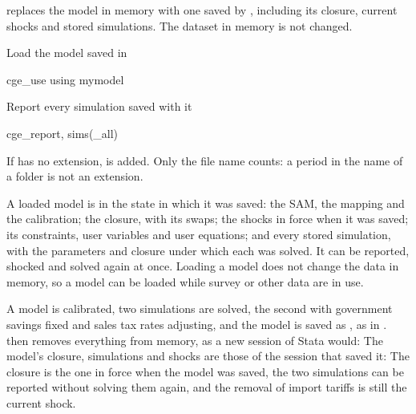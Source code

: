 

 replaces the model in memory with one saved by
, including its closure, current shocks and stored
simulations. The dataset in memory is not changed.


Load the model saved in 
\begin{stcode}
cge_use using mymodel
\end{stcode}
Report every simulation saved with it
\begin{stcode}
cge_report, sims(_all)
\end{stcode}


\begin{stsyntax}
  
\end{stsyntax}
If  has no extension,  is added. Only the file
name counts: a period in the name of a folder is not an extension.


A loaded model is in the state in which it was saved: the SAM, the mapping and
the calibration; the closure, with its swaps; the shocks in force when it was
saved; its constraints, user variables and user equations; and every stored
simulation, with the parameters and closure under which each was solved. It
can be reported, shocked and solved again at once. Loading a model does not
change the data in memory, so a model can be loaded while survey or other data
are in use.


A model is calibrated, two simulations are solved, the second with government
savings fixed and sales tax rates adjusting, and the model is saved as
, as in .  then removes
everything from memory, as a new session of Stata would:
The model's closure, simulations and shocks are those of the session that saved
it:
The closure is the one in force when the model was saved, the two simulations
can be reported without solving them again, and the removal of import tariffs
is still the current shock.


